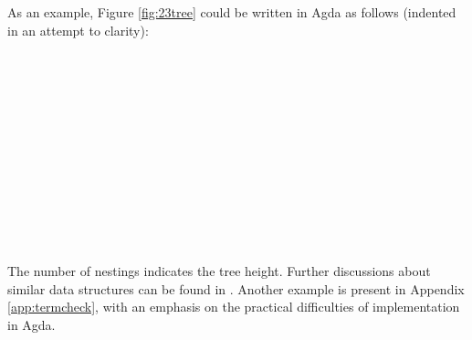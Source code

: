 \documentclass[12pt,twoside,notitlepage]{report}
\begin{document}
\begin{code}
\\
\>  \AgdaSymbol{(} \AgdaSymbol{:} \AgdaSymbol{)} \AgdaSymbol{:}  \<%
\\
\>[0]\<[2]%
\>[2] \AgdaSymbol{:}    \<%
\\
\>[0]\<[2]%
\>[2] \AgdaSymbol{:}  \AgdaSymbol{(} \AgdaSymbol{)}   \<%
\\
\end{code}

As an example, Figure \ref{fig:23tree} could be written in Agda as follows (indented in an attempt to clarity):

\begin{code}
\\
\> \AgdaSymbol{:}  \<%
\\
\> \AgdaSymbol{=} \AgdaSymbol{(}\AgdaSymbol{(}\AgdaSymbol{(}\<%
\\
\>[2]\<[14]%
\>[14]\AgdaSymbol{(}\<%
\\
\>[14]\<[18]%
\>[18]\AgdaSymbol{(}\<%
\\
\>[18]\<[20]%
\>[20]\AgdaSymbol{(}   \AgdaSymbol{)}\<%
\\
\>[18]\<[20]%
\>[20]\AgdaSymbol{(}  \AgdaSymbol{)}\<%
\\
\>[18]\<[20]%
\>[20]\AgdaSymbol{(}  \AgdaSymbol{))}\<%
\\
\>[0]\<[18]%
\>[18]\AgdaSymbol{(}\<%
\\
\>[18]\<[20]%
\>[20]\AgdaSymbol{(}   \AgdaSymbol{)}\<%
\\
\>[18]\<[20]%
\>[20]\AgdaSymbol{(}  \AgdaSymbol{))))))}\<%
\\
\end{code}
The number of  nestings indicates the tree height. 
Further discussions about similar data structures can be found in \cite{nestedhinze}. Another example is present in Appendix \ref{app:termcheck}, with an emphasis on the practical difficulties of implementation in Agda.
\end{document}
